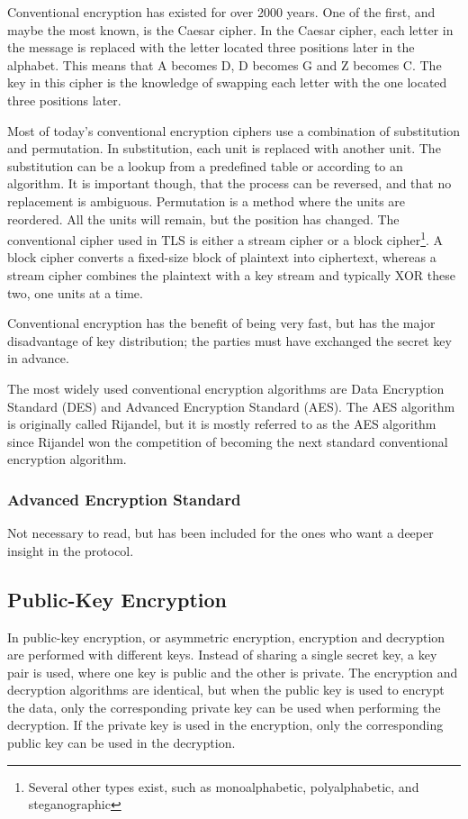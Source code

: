 \documentclass[12pt,a4paper,titlepage]{report}
\begin{document}
Conventional encryption has existed for over 2000 years. One of the first, and maybe the most known, is the Caesar cipher. In the Caesar cipher, each letter in the message is replaced with the letter located three positions later in the alphabet. This means that A becomes D, D becomes G and Z becomes C. The key in this cipher is the knowledge of swapping each letter with the one located three positions later. 

Most of today's conventional encryption ciphers use a combination of substitution and permutation. In substitution, each unit is replaced with another unit. The substitution can be a lookup from a predefined table or according to an algorithm. It is important though, that the process can be reversed, and that no replacement is ambiguous. Permutation is a method where the units are reordered. All the units will remain, but the position has changed. The conventional cipher used in TLS is either a stream cipher or a block cipher\footnote{Several other types exist, such as monoalphabetic, polyalphabetic, and steganographic}. A block cipher converts a fixed-size block of plaintext into ciphertext, whereas a stream cipher combines the plaintext with a key stream and typically XOR these two, one units at a time.

Conventional encryption has the benefit of being very fast, but has the major disadvantage of key distribution; the parties must have exchanged the secret key in advance. 

The most widely used conventional encryption algorithms are Data Encryption Standard (DES) and Advanced Encryption Standard (AES). The AES algorithm is originally called Rijandel, but it is mostly referred to as the AES algorithm since Rijandel won the competition of becoming the next standard conventional encryption algorithm.

\subsubsection{Advanced Encryption Standard}
Not necessary to read, but has been included for the ones who want a deeper insight in the protocol.

\subsection{Public-Key Encryption}
In public-key encryption, or asymmetric encryption, encryption and decryption are performed with different keys. Instead of sharing a single secret key, a key pair is used, where one key is public and the other is private. The encryption and decryption algorithms are identical, but when the public key is used to encrypt the data, only the corresponding private key can be used when performing the decryption. If the private key is used in the encryption, only the corresponding public key can be used in the decryption. 
\end{document}
